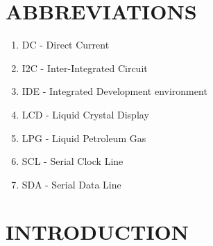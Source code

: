 \documentclass[a4paper,12pt]{report}
\begin{document}
\chapter*{ABBREVIATIONS}
\begin{enumerate}
 	\item DC       - Direct Current
 	\item I2C      - Inter-Integrated Circuit
	\item IDE      - Integrated Development environment
	\item LCD      - Liquid Crystal Display
 	\item LPG      - Liquid Petroleum Gas
 	\item SCL      - Serial Clock Line
	\item SDA      - Serial Data Line
	
\end{enumerate}

 

\renewcommand{\chaptername}{CHAPTER}
\chapter{INTRODUCTION}
\end{document}
